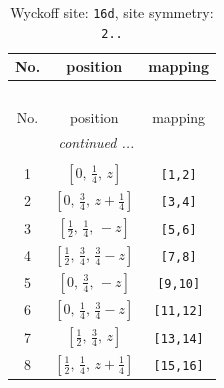 \documentclass[fleqn,8pt]{jsarticle}
\begin{document}
\begin{longtable}{ccc}
\caption{Wyckoff site: {\tt 16d}, site symmetry: {\tt 2..}}
 \\
 \hline \hline
No. & position & mapping \\ \hline \endfirsthead

\multicolumn{2}{l}{\tablename\ \thetable{}} \\
 \hline \hline
No. & position & mapping \\ \hline \endhead

 \hline \hline
\multicolumn{2}{r}{\footnotesize\it continued ...} \\ \endfoot

 \hline \hline
\multicolumn{2}{r}{} \\ \endlastfoot

1 & $\left[ 0,\, \frac{1}{4},\, z \right]$ & {\tt [1,2]} \\ \hline
2 & $\left[ 0,\, \frac{3}{4},\, z + \frac{1}{4} \right]$ & {\tt [3,4]} \\ \hline
3 & $\left[ \frac{1}{2},\, \frac{1}{4},\, - z \right]$ & {\tt [5,6]} \\ \hline
4 & $\left[ \frac{1}{2},\, \frac{3}{4},\, \frac{3}{4} - z \right]$ & {\tt [7,8]} \\ \hline
5 & $\left[ 0,\, \frac{3}{4},\, - z \right]$ & {\tt [9,10]} \\ \hline
6 & $\left[ 0,\, \frac{1}{4},\, \frac{3}{4} - z \right]$ & {\tt [11,12]} \\ \hline
7 & $\left[ \frac{1}{2},\, \frac{3}{4},\, z \right]$ & {\tt [13,14]} \\ \hline
8 & $\left[ \frac{1}{2},\, \frac{1}{4},\, z + \frac{1}{4} \right]$ & {\tt [15,16]} \\
\end{longtable}
\renewcommand{\arraystretch}{1.2}
\end{document}
